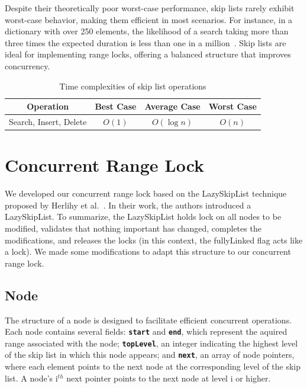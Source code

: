 Despite their theoretically poor worst-case performance, skip lists rarely exhibit worst-case behavior, making them efficient in most scenarios. For instance, in a dictionary with over 250 elements, the likelihood of a search taking more than three times the expected duration is less than one in a million~\parencite{pugh1990skip2}. Skip lists are ideal for implementing range locks, offering a balanced structure that improves concurrency.


\begin{table}[h!]
    \centering
    \begin{tabular}{|c|c|c|c|}
        \hline
        \textbf{Operation} & \textbf{Best Case} & \textbf{Average Case} & \textbf{Worst Case} \\ \hline
 Search, Insert, Delete & $O(1)$ & $O(\log n)$ & $O(n)$ \\ \hline
    \end{tabular}
    \caption{Time complexities of skip list operations}
    \label{table:skiplisttimecomplexity}
\end{table}

\newpage

\section{Concurrent Range Lock}

We developed our concurrent range lock based on the LazySkipList technique proposed by Herlihy et al.~\parencite{herlihy2020art}. In their work, the authors introduced a LazySkipList. To summarize, the LazySkipList holds lock on all nodes to be modified, validates that nothing important has changed, completes the modifications, and releases the locks (in this context, the fullyLinked flag acts like a lock). We made some modifications to adapt this structure to our concurrent range lock.

\subsection{Node}

The structure of a node is designed to facilitate efficient concurrent operations. Each node contains several fields: \textbf\texttt{{{start}}} and \textbf{\texttt{\texttt{end}}}, which represent the aquired range associated with the node; \textbf{\texttt{{topLevel}}}, an integer indicating the highest level of the skip list in which this node appears; and \textbf{\texttt{next}}, an array of node pointers, where each element points to the next node at the corresponding level of the skip list. A node's i$^{th}$ next pointer points to the next node at level i or higher. 


